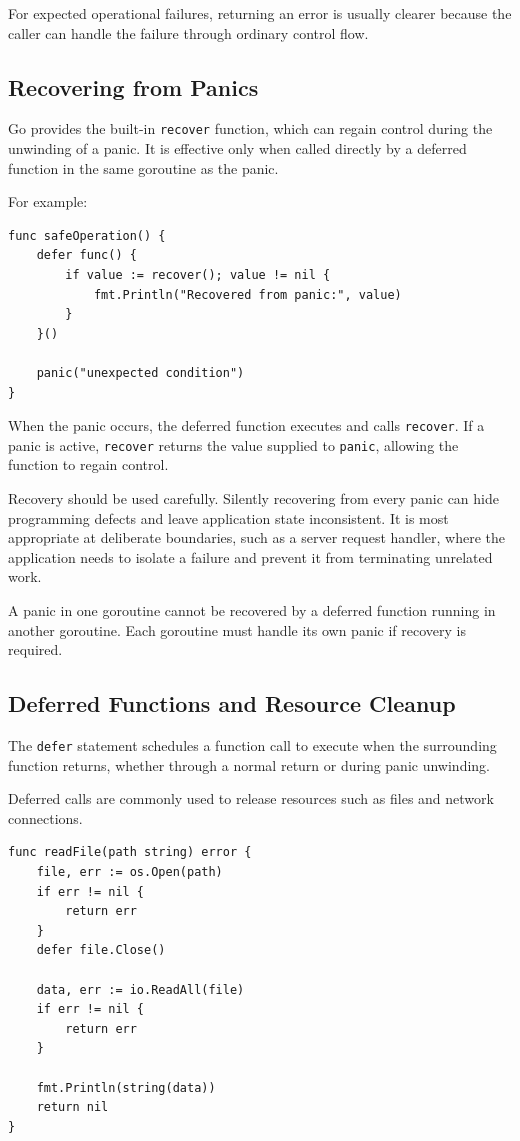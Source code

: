 For expected operational failures, returning an error is usually clearer because the caller can handle the failure through ordinary control flow.

\subsection{Recovering from Panics}

Go provides the built-in \texttt{recover} function, which can regain control during the unwinding of a panic. It is effective only when called directly by a deferred function in the same goroutine as the panic.

For example:

\begin{lstlisting}
func safeOperation() {
    defer func() {
        if value := recover(); value != nil {
            fmt.Println("Recovered from panic:", value)
        }
    }()

    panic("unexpected condition")
}
\end{lstlisting}

When the panic occurs, the deferred function executes and calls \texttt{recover}. If a panic is active, \texttt{recover} returns the value supplied to \texttt{panic}, allowing the function to regain control.

Recovery should be used carefully. Silently recovering from every panic can hide programming defects and leave application state inconsistent. It is most appropriate at deliberate boundaries, such as a server request handler, where the application needs to isolate a failure and prevent it from terminating unrelated work.

A panic in one goroutine cannot be recovered by a deferred function running in another goroutine. Each goroutine must handle its own panic if recovery is required.

\subsection{Deferred Functions and Resource Cleanup}

The \texttt{defer} statement schedules a function call to execute when the surrounding function returns, whether through a normal return or during panic unwinding.

Deferred calls are commonly used to release resources such as files and network connections.

\begin{lstlisting}
func readFile(path string) error {
    file, err := os.Open(path)
    if err != nil {
        return err
    }
    defer file.Close()

    data, err := io.ReadAll(file)
    if err != nil {
        return err
    }

    fmt.Println(string(data))
    return nil
}
\end{lstlisting}


